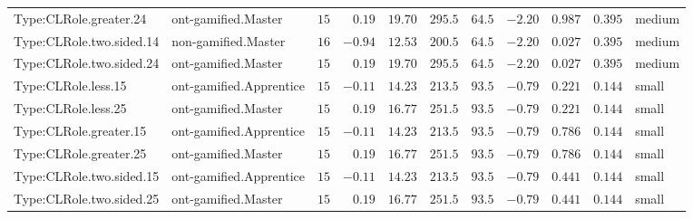 \documentclass[6pt,a4paper]{article}
\begin{document}
{\begin{longtable}{llrrrrrrrrl}
Type:CLRole.greater.24&ont-gamified.Master&$15$&$ 0.19$&$19.70$&$ 295.5$&$ 64.5$&$-2.20$&$0.987$&$0.395$&medium\tabularnewline
Type:CLRole.two.sided.14&non-gamified.Master&$16$&$-0.94$&$12.53$&$ 200.5$&$ 64.5$&$-2.20$&$0.027$&$0.395$&medium\tabularnewline
Type:CLRole.two.sided.24&ont-gamified.Master&$15$&$ 0.19$&$19.70$&$ 295.5$&$ 64.5$&$-2.20$&$0.027$&$0.395$&medium\tabularnewline
Type:CLRole.less.15&ont-gamified.Apprentice&$15$&$-0.11$&$14.23$&$ 213.5$&$ 93.5$&$-0.79$&$0.221$&$0.144$&small\tabularnewline
Type:CLRole.less.25&ont-gamified.Master&$15$&$ 0.19$&$16.77$&$ 251.5$&$ 93.5$&$-0.79$&$0.221$&$0.144$&small\tabularnewline
Type:CLRole.greater.15&ont-gamified.Apprentice&$15$&$-0.11$&$14.23$&$ 213.5$&$ 93.5$&$-0.79$&$0.786$&$0.144$&small\tabularnewline
Type:CLRole.greater.25&ont-gamified.Master&$15$&$ 0.19$&$16.77$&$ 251.5$&$ 93.5$&$-0.79$&$0.786$&$0.144$&small\tabularnewline
\newpage
Type:CLRole.two.sided.15&ont-gamified.Apprentice&$15$&$-0.11$&$14.23$&$ 213.5$&$ 93.5$&$-0.79$&$0.441$&$0.144$&small\tabularnewline
Type:CLRole.two.sided.25&ont-gamified.Master&$15$&$ 0.19$&$16.77$&$ 251.5$&$ 93.5$&$-0.79$&$0.441$&$0.144$&small\tabularnewline
\hline
\end{longtable}}
\end{document}
